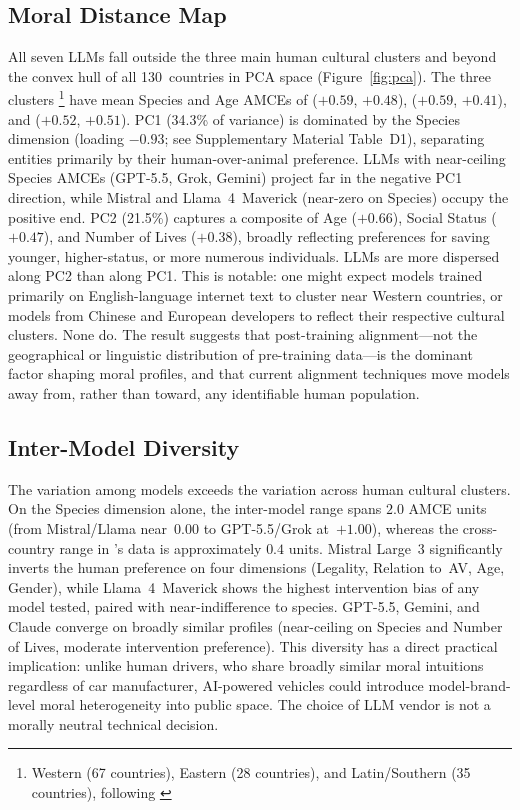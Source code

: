 \documentclass[letterpaper]{article}
\begin{document}
\subsection{Moral Distance Map}

All seven LLMs fall outside the three main human cultural clusters and beyond
the convex hull of all 130~countries in PCA space (Figure~\ref{fig:pca}).
The three clusters \footnote{Western (67 countries), Eastern (28 countries),
and Latin/Southern (35 countries), following \citet{awad2018}} have mean Species
and Age AMCEs of ($+0.59$, $+0.48$), ($+0.59$, $+0.41$), and ($+0.52$,
$+0.51$).
PC1 (34.3\% of variance) is dominated by the Species dimension (loading
$-0.93$; see Supplementary Material Table~D1), separating entities primarily
by their human-over-animal preference.
LLMs with near-ceiling Species AMCEs (GPT-5.5, Grok, Gemini) project far in
the negative PC1 direction, while Mistral and Llama~4~Maverick
(near-zero on Species) occupy the positive end.
PC2 (21.5\%) captures a composite of Age ($+0.66$), Social Status ($+0.47$),
and Number of Lives ($+0.38$), broadly reflecting preferences for
saving younger, higher-status, or more numerous individuals.
LLMs are more dispersed along PC2 than along PC1. This is notable:
one might expect models trained primarily on English-language internet
text to cluster near Western countries, or models from Chinese and European
developers to reflect their respective cultural clusters. None do. The result
suggests that post-training alignment---not the geographical or linguistic
distribution of pre-training data---is the dominant factor shaping moral profiles,
and that current alignment techniques move models away from, rather than toward,
any identifiable human population.

\subsection{Inter-Model Diversity}

The variation among models exceeds the variation across human cultural clusters.
On the Species dimension alone, the inter-model range spans $2.0$ AMCE units
(from Mistral/Llama near~$0.00$ to GPT-5.5/Grok at~$+1.00$), whereas the
cross-country range in \citeauthor{awad2018}'s data is approximately $0.4$ units.
Mistral Large~3 significantly inverts the human preference on four dimensions
(Legality, Relation to~AV, Age, Gender), while Llama~4~Maverick shows the highest
intervention bias of any model tested, paired with near-indifference to species.
GPT-5.5, Gemini, and Claude converge on broadly similar profiles (near-ceiling on
Species and Number of Lives, moderate intervention preference). This diversity has
a direct practical implication: unlike human drivers, who share broadly similar
moral intuitions regardless of car manufacturer, AI-powered vehicles could
introduce model-brand-level moral heterogeneity into public space. The choice of
LLM vendor is not a morally neutral technical decision.
\end{document}
